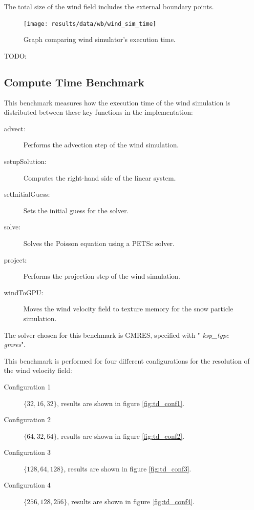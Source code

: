 The total size of the wind field includes the external boundary points.

\begin{figure}[ht]
	\center
	\texttt{[image: results/data/wb/wind\_sim\_time]}
	\caption{Graph comparing wind simulator's execution time.}
	\label{fig:wind_sim_time}
\end{figure}

TODO: 

\subsection{Compute Time Benchmark}

This benchmark measures how the execution time of the wind simulation is distributed
between these key functions in the implementation:
\begin{description}
	\item[advect:] Performs the advection step of the wind simulation.
	\item[setupSolution:] Computes the right-hand side of the linear system.
	\item[setInitialGuess:] Sets the initial guess for the solver.
	\item[solve:] Solves the Poisson equation using a PETSc solver.
	\item[project:] Performs the projection step of the wind simulation.
	\item[windToGPU:] Moves the wind velocity field to texture memory for the
	snow particle simulation.
\end{description}

The solver chosen for this benchmark is GMRES, specified with "\emph{-ksp\_type
gmres}".

This benchmark is performed for four different configurations for the resolution of
the wind velocity field:
\begin{description}
	\item[Configuration 1] $ \{ 32, 16, 32 \} $, results are shown in figure
		\ref{fig:td_conf1}.
	\item[Configuration 2] $ \{ 64, 32, 64 \} $, results are shown in figure
		\ref{fig:td_conf2}.
	\item[Configuration 3] $ \{ 128, 64, 128 \} $, results are shown in figure
		\ref{fig:td_conf3}.
	\item[Configuration 4] $ \{ 256, 128, 256 \} $, results are shown in figure
		\ref{fig:td_conf4}.
\end{description}

